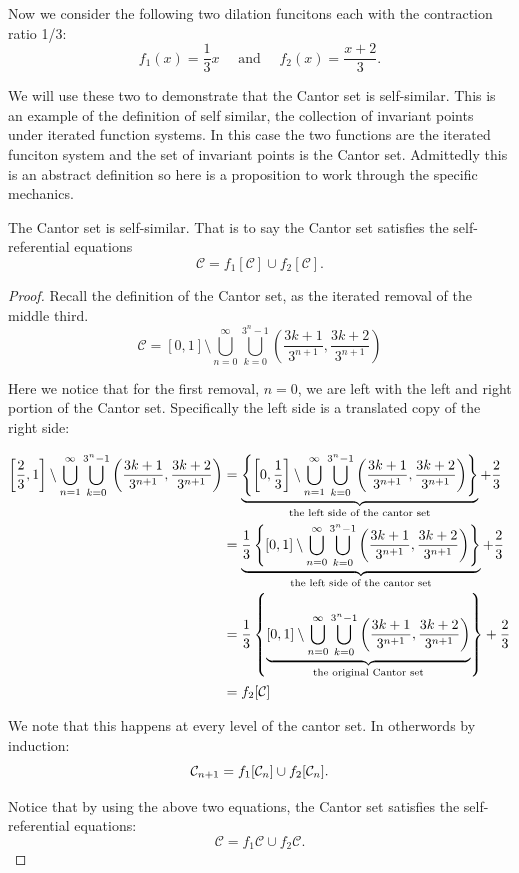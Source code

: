 Now we consider the following two dilation funcitons each with the contraction ratio 1/3: 
$$f_1 (x) = \frac{1}{3}x \quad \text{ and } \quad f_2 (x) = \frac{x+2}{3}.$$


We will use these two to demonstrate that the Cantor set is self-similar.  This is an example of the definition of self similar, the collection of invariant points under iterated function systems.  In this case the two functions are the iterated funciton system and the set of invariant points is the Cantor set.  Admittedly this is an abstract definition so here is a proposition to work through the specific mechanics.  

\begin{proposition}The Cantor set is self-similar.   That is to say the Cantor set satisfies the self-referential equations 
    $$\mathcal{C} = f_1 [\mathcal{C}] \cup f_2 [\mathcal{C}].$$
\end{proposition}
\begin{proof}
    Recall the definition of the Cantor set, as the iterated removal of the middle third.      
    $$\mathcal{C} = [0,1] \setminus \bigcup_{n=0}^\infty\bigcup_{k=0}^{3^n-1}\left(\frac{3k+1}{3^{n+1}},\frac{3k+2}{3^{n+1}}\right)$$

    Here we notice that for the first removal, $n = 0$, we are left with the left and right portion of the Cantor set.  Specifically the left side is a translated copy of the right side:

    \begin{align*}
        \left[\frac{2}{3},1\right] \setminus \bigcup_{n=1}^\infty\bigcup_{k=0}^{3^n-1}\left(\frac{3k+1}{3^{n+1}},\frac{3k+2}{3^{n+1}}\right) &= \underbrace{ \left\{\left[0,\frac{1}{3}\right] \setminus \bigcup_{n=1}^\infty\bigcup_{k=0}^{3^n-1}\left(\frac{3k+1}{3^{n+1}},\frac{3k+2}{3^{n+1}}\right)\right\} }_{\text{the left side of the cantor set}}  + \frac{2}{3}\\
        &= \underbrace{ \frac{1}{3}\left\{[0,1] \setminus \bigcup_{n=0}^\infty\bigcup_{k=0}^{3^n-1}\left(\frac{3k+1}{3^{n+1}},\frac{3k+2}{3^{n+1}}\right)\right\} }_{\text{the left side of the cantor set}}  + \frac{2}{3} \\
        &= \frac{1}{3}\left\{ \underbrace{ [0,1] \setminus \bigcup_{n=0}^\infty\bigcup_{k=0}^{3^n-1}\left(\frac{3k+1}{3^{n+1}},\frac{3k+2}{3^{n+1}}\right) }_{\text{the original Cantor set}} \right\}   + \frac{2}{3} \\
        &=f_2 [\mathcal{C}] 
    \end{align*}

    We note that this happens at every level of the cantor set.  In otherwords by induction:
    $$\mathcal{C}_{n+1} = f_1[\mathcal{C}_n] \cup f_2 [\mathcal{C}_n].$$

    Notice that by using the above two equations, the Cantor set satisfies the self-referential equations:
    $$\mathcal{C} = f_1 \mathcal{C} \cup f_2 \mathcal{C}.$$


\end{proof}
